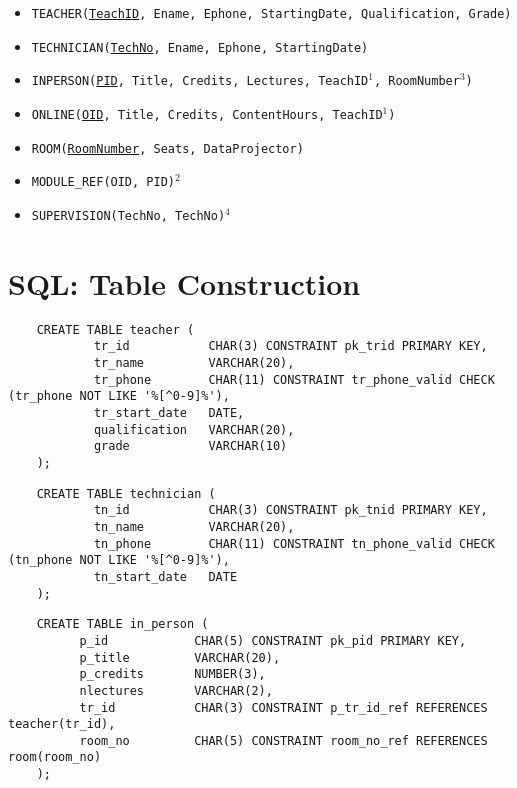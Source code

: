 \documentclass[11pt, english]{article}
\begin{document}
	\begin{itemize}
	\setlength\itemsep{0cm}
		\item \texttt{TEACHER(\underline{TeachID}, Ename, Ephone, StartingDate, Qualification, Grade)}
		\item \texttt{TECHNICIAN(\underline{TechNo}, Ename, Ephone, StartingDate)}
		\item \texttt{INPERSON(\underline{PID}, Title, Credits, Lectures, TeachID$\mathrm{^1}$, RoomNumber$\mathrm{^3}$)}
		\item \texttt{ONLINE(\underline{OID}, Title, Credits, ContentHours, TeachID$\mathrm{^1}$)}
		\item \texttt{ROOM(\underline{RoomNumber}, Seats, DataProjector)}
		\item \texttt{MODULE\_REF(OID, PID)$\mathrm{^2}$}
		\item \texttt{SUPERVISION(TechNo, TechNo)$\mathrm{^4}$}
	\end{itemize}

\newpage

\section{SQL: Table Construction}

	{\scriptsize\begin{verbatim}
	CREATE TABLE teacher (
        	tr_id           CHAR(3) CONSTRAINT pk_trid PRIMARY KEY,
        	tr_name         VARCHAR(20),
        	tr_phone        CHAR(11) CONSTRAINT tr_phone_valid CHECK (tr_phone NOT LIKE '%[^0-9]%'),
        	tr_start_date   DATE,
        	qualification   VARCHAR(20),
        	grade           VARCHAR(10)
	);
	\end{verbatim}}

	{\scriptsize\begin{verbatim}
	CREATE TABLE technician (
        	tn_id           CHAR(3) CONSTRAINT pk_tnid PRIMARY KEY,
        	tn_name         VARCHAR(20),
        	tn_phone        CHAR(11) CONSTRAINT tn_phone_valid CHECK (tn_phone NOT LIKE '%[^0-9]%'),
        	tn_start_date   DATE
	);
	\end{verbatim}}

	{\scriptsize\begin{verbatim}
	CREATE TABLE in_person (
  	      p_id            CHAR(5) CONSTRAINT pk_pid PRIMARY KEY,
  	      p_title         VARCHAR(20),
  	      p_credits       NUMBER(3),
  	      nlectures       VARCHAR(2),
  	      tr_id           CHAR(3) CONSTRAINT p_tr_id_ref REFERENCES teacher(tr_id),
  	      room_no         CHAR(5) CONSTRAINT room_no_ref REFERENCES room(room_no)
	);
	\end{verbatim}}
\end{document}
